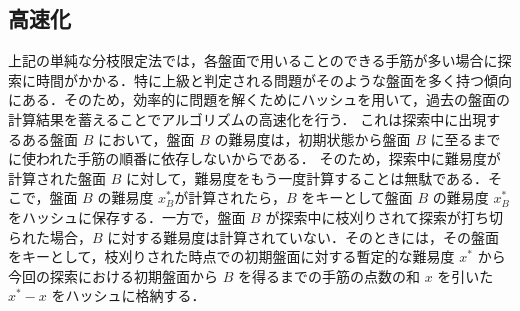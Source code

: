 \documentclass[submit,techrep,noauthor]{ipsj}
\begin{document}
	\subsection{高速化}
\label{sec:hash}
上記の単純な分枝限定法では，各盤面で用いることのできる手筋が多い場合に探索に時間がかかる．特に上級と判定される問題がそのような盤面を多く持つ傾向にある．そのため，効率的に問題を解くためにハッシュを用いて，過去の盤面の計算結果を蓄えることでアルゴリズムの高速化を行う．
これは探索中に出現するある盤面 $B$ において，盤面 $B$ の難易度は，初期状態から盤面 $B$ に至るまでに使われた手筋の順番に依存しないからである．%
そのため，探索中に難易度が計算された盤面 $B$ に対して，難易度をもう一度計算することは無駄である．そこで，盤面 $B$ の難易度 $x^*_B$が計算されたら，$B$ をキーとして盤面 $B$ の難易度 $x^*_B$ をハッシュに保存する．一方で，盤面 $B$ が探索中に枝刈りされて探索が打ち切られた場合，$B$ に対する難易度は計算されていない．そのときには，その盤面をキーとして，枝刈りされた時点での初期盤面に対する暫定的な難易度 $x^*$ から今回の探索における初期盤面から $B$ を得るまでの手筋の点数の和 $x$ を引いた $x^* - x$ をハッシュに格納する．%
\end{document}
